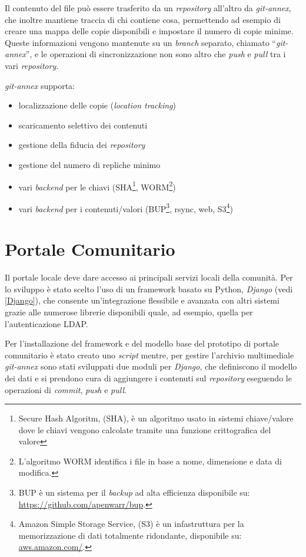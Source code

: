 Il contenuto del file può essere trasferito da un \emph{repository}
all'altro da \emph{git-annex}, che inoltre mantiene traccia di chi
contiene cosa, permettendo ad esempio di creare una mappa delle copie
disponibili e impostare il numero di copie minime. Queste informazioni
vengono mantenute su un \emph{branch} separato, chiamato
``\emph{git-annex}'', e le operazioni di sincronizzazione non sono
altro che \emph{push} e \emph{pull} tra i vari \emph{repository}.

\emph{git-annex} supporta:
\begin{itemize}
\item localizzazione delle copie (\emph{location tracking})
\item scaricamento selettivo dei contenuti
\item gestione della fiducia dei \emph{repository}
\item gestione del numero di repliche minimo 
\item vari \emph{backend} per le chiavi (SHA\footnote{Secure Hash
    Algoritm, (SHA), è un algoritmo usato in sistemi chiave/valore
    dove le chiavi vengono calcolate tramite una funzione
    crittografica del valore}, WORM\footnote{L'algoritmo WORM
    identifica i file in base a nome, dimensione e data di modifica.})
\item vari \emph{backend} per i contenuti/valori (BUP\footnote{BUP è
    un sistema per il \emph{backup} ad alta efficienza disponibile su:
    \url{https://github.com/apenwarr/bup}.}, rsync, web,
  S3\footnote{Amazon Simple Storage Service, (S3) è un infastruttura
    per la memorizzazione di dati totalmente ridondante, disponibile
    su: \url{aws.amazon.com/}.})
\end{itemize}

\section{Portale Comunitario}
Il portale locale deve dare accesso ai principali servizi locali della
comunità. Per lo sviluppo è stato scelto l'uso di un framework basato
su Python, \emph{Django} (vedi \ref{Django}), che consente
un'integrazione flessibile e avanzata con altri sistemi grazie alle
numerose librerie disponibili quale, ad esempio, quella per
l'autenticazione LDAP.

Per l'installazione del framework e del modello base del prototipo di
portale comunitario è stato creato uno \emph{script} mentre, per
gestire l'archivio multimediale \emph{git-annex} sono stati sviluppati
due moduli per \emph{Django}, che definiscono il modello dei dati e si
prendono cura di aggiungere i contenuti sul \emph{repository}
eseguendo le operazioni di \emph{commit}, \emph{push} e \emph{pull}.

